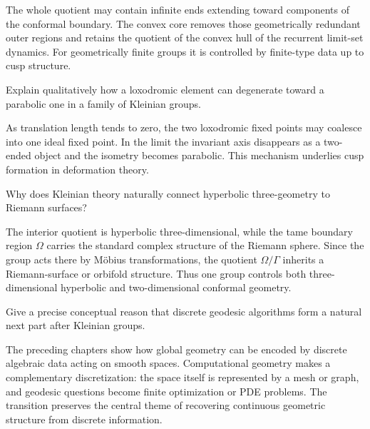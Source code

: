 \begin{solution}
The whole quotient may contain infinite ends extending toward components of the conformal boundary.  The convex core removes those geometrically redundant outer regions and retains the quotient of the convex hull of the recurrent limit-set dynamics.  For geometrically finite groups it is controlled by finite-type data up to cusp structure.
\end{solution}

\begin{problem}\label{prob:vii37-ch03}
Explain qualitatively how a loxodromic element can degenerate toward a parabolic one in a family of Kleinian groups.
\end{problem}

\begin{solution}
As translation length tends to zero, the two loxodromic fixed points may coalesce into one ideal fixed point.  In the limit the invariant axis disappears as a two-ended object and the isometry becomes parabolic.  This mechanism underlies cusp formation in deformation theory.
\end{solution}

\begin{problem}\label{prob:vii37-ch04}
Why does Kleinian theory naturally connect hyperbolic three-geometry to Riemann surfaces?
\end{problem}

\begin{solution}
The interior quotient is hyperbolic three-dimensional, while the tame boundary region \(\Omega\) carries the standard complex structure of the Riemann sphere.  Since the group acts there by Möbius transformations, the quotient \(\Omega/\Gamma\) inherits a Riemann-surface or orbifold structure.  Thus one group controls both three-dimensional hyperbolic and two-dimensional conformal geometry.
\end{solution}

\begin{problem}\label{prob:vii37-ch05}
Give a precise conceptual reason that discrete geodesic algorithms form a natural next part after Kleinian groups.
\end{problem}

\begin{solution}
The preceding chapters show how global geometry can be encoded by discrete algebraic data acting on smooth spaces.  Computational geometry makes a complementary discretization: the space itself is represented by a mesh or graph, and geodesic questions become finite optimization or PDE problems.  The transition preserves the central theme of recovering continuous geometric structure from discrete information.
\end{solution}
